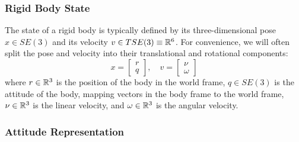 \documentclass[conference]{IEEEtran}
\begin{document}
\subsubsection{Rigid Body State}

The state of a rigid body is typically defined by its three-dimensional pose $x \in SE(3)$
and its velocity $v \in TSE(3) \equiv \mathbb{R}^6$. For convenience, we will often split the 
pose and velocity into their translational and rotational components:
\begin{equation}
    x = \begin{bmatrix}
        r \\ q
    \end{bmatrix}, \quad 
    v = \begin{bmatrix}
        \nu \\ \omega     
    \end{bmatrix}
\end{equation}
where $r \in \mathbb{R}^3$ is the position of the body in the world frame, $q \in SE(3)$ is the 
attitude of the body, mapping vectors in the body frame to the world frame, $\nu \in \mathbb{R}^3$ 
is the linear velocity, and $\omega \in \mathbb{R}^3$ is the angular velocity. 

\subsubsection{Attitude Representation}
\end{document}
